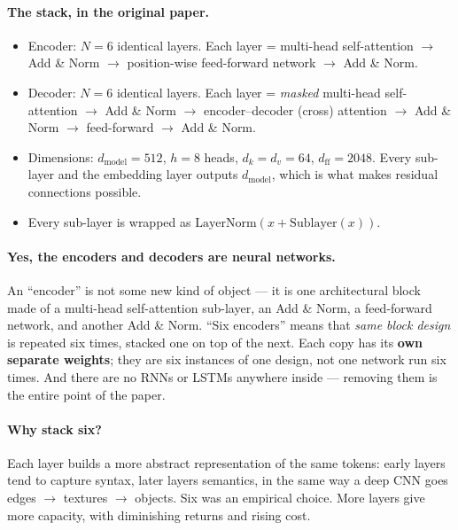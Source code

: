 \documentclass[11pt,a4paper]{article}
\begin{document}
\paragraph{The stack, in the original paper.}
\begin{itemize}
\item Encoder: $N = 6$ identical layers. Each layer = multi-head self-attention $\rightarrow$
  Add \& Norm $\rightarrow$ position-wise feed-forward network $\rightarrow$ Add \& Norm.
\item Decoder: $N = 6$ identical layers. Each layer = \emph{masked} multi-head self-attention
  $\rightarrow$ Add \& Norm $\rightarrow$ encoder--decoder (cross) attention $\rightarrow$
  Add \& Norm $\rightarrow$ feed-forward $\rightarrow$ Add \& Norm.
\item Dimensions: $d_{\text{model}} = 512$, $h = 8$ heads, $d_k = d_v = 64$,
  $d_{\text{ff}} = 2048$. Every sub-layer and the embedding layer outputs
  $d_{\text{model}}$, which is what makes residual connections possible.
\item Every sub-layer is wrapped as $\mathrm{LayerNorm}(x + \mathrm{Sublayer}(x))$.
\end{itemize}

\paragraph{Yes, the encoders and decoders are neural networks.} An ``encoder'' is not some
new kind of object --- it is one architectural block made of a multi-head self-attention
sub-layer, an Add \& Norm, a feed-forward network, and another Add \& Norm. ``Six encoders''
means that \emph{same block design} is repeated six times, stacked one on top of the next.
Each copy has its \textbf{own separate weights}; they are six instances of one design, not one
network run six times. And there are no RNNs or LSTMs anywhere inside --- removing them is the
entire point of the paper.

\paragraph{Why stack six?} Each layer builds a more abstract representation of the same
tokens: early layers tend to capture syntax, later layers semantics, in the same way a deep
CNN goes edges $\rightarrow$ textures $\rightarrow$ objects. Six was an empirical choice. More
layers give more capacity, with diminishing returns and rising cost.
\end{document}

